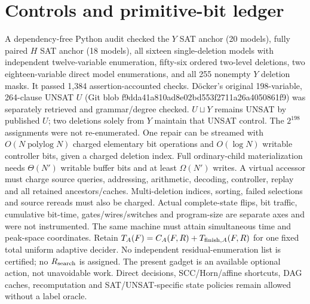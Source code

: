 \documentclass[11pt]{article}
\begin{document}
\section{Controls and primitive-bit ledger}
A dependency-free Python audit checked the $Y$ SAT anchor (20 models), fully paired $H$ SAT anchor (18 models), all sixteen single-deletion models with independent twelve-variable enumeration, fifty-six ordered two-level deletions, two eighteen-variable direct model enumerations, and all 255 nonempty $Y$ deletion masks. It passed 1,384 assertion-accounted checks. D\"ocker's original 198-variable, 264-clause UNSAT $U$ (Git blob f9dda41a810ad8e02bd553f2711a26a4050861f9) was separately retrieved and grammar/degree checked. $U\sqcup Y$ remains UNSAT by published $U$; two deletions solely from $Y$ maintain that UNSAT control. The $2^{198}$ assignments were not re-enumerated.
One repair can be streamed with $O(N\operatorname{polylog}N)$ charged elementary bit operations and $O(\log N)$ writable controller bits, given a charged deletion index. Full ordinary-child materialization needs $\Theta(N')$ writable buffer bits and at least $\Omega(N')$ writes. A virtual accessor must charge source queries, addressing, arithmetic, decoding, controller, replay and all retained ancestors/caches. Multi-deletion indices, sorting, failed selections and source rereads must also be charged. Actual complete-state flips, bit traffic, cumulative bit-time, gates/wires/switches and program-size are separate axes and were not instrumented. The same machine must attain simultaneous time and peak-space coordinates.
Retain $T_A(F)=C_A(F,R)+T_{{\rm finish},A}(F,R)$ for one fixed total uniform adaptive decider. No independent residual-enumeration list is certified; no $R_{\rm search}$ is assigned. The present gadget is an available optional action, not unavoidable work. Direct decisions, SCC/Horn/affine shortcuts, DAG caches, recomputation and SAT/UNSAT-specific state policies remain allowed without a label oracle.
\end{document}
